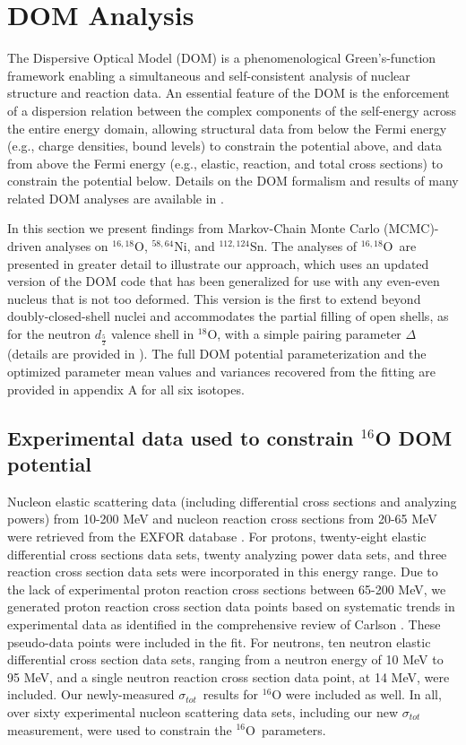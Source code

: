 \documentclass[twocolumn,secnumarabic,amssymb, nobibnotes, aps, prl,
superscriptaddress, nobalancelastpage]{revtex4}
\newcommand{\tot}{\ensuremath{\sigma_{tot}}}
\newcommand{\oSix}{\ensuremath{^{16}}O}
\newcommand{\oEight}{\ensuremath{^{18}}O}
\newcommand{\oSixEight}{\ensuremath{^{16,18}}O}
\newcommand{\niEightFour}{\ensuremath{^{58,64}}N\lowercase{i}}
\newcommand{\snTwelveFour}{\ensuremath{^{112,124}}S\lowercase{n}}
\begin{document}
\section{DOM Analysis}

The Dispersive Optical Model (DOM) is a phenomenological Green's-function
framework enabling a simultaneous and self-consistent analysis of nuclear
structure and reaction data.
An essential feature of the DOM is the enforcement of a dispersion
relation between the complex components of the self-energy across the entire
energy domain, allowing structural data from below the Fermi energy
(e.g., charge densities, bound levels) to constrain the potential above,
and data from above the Fermi energy (e.g., elastic, reaction, and total
cross sections) to constrain the potential
below. Details on the DOM formalism and results of many related DOM analyses are
available in \cite{Mahaux1991, Dickhoff2018, PruittPhDThesis, AtkinsonPhDThesis, MahzoonPhDThesis}.

In this section we present findings from Markov-Chain Monte Carlo
(MCMC)-driven analyses on \oSixEight, \niEightFour, and \snTwelveFour.
The analyses of \oSixEight\ are presented in
greater detail to illustrate our approach, which uses an updated version
of the DOM code that has been generalized for use with any even-even nucleus
that is not too deformed.  This version is the first to extend beyond doubly-closed-shell
nuclei and accommodates the partial filling
of open shells, as for the neutron $d_{\frac{5}{2}}$ valence shell in \oEight, with a simple
pairing parameter $\Delta$ (details are provided in \cite{PruittPhDThesis}).
The full DOM potential parameterization and the optimized parameter mean values
and variances recovered from the fitting are provided in appendix A for all six
isotopes.

\subsection{Experimental data used to constrain $^{16}$O DOM potential}

Nucleon elastic scattering data (including differential cross sections and analyzing
powers) from 10-200 MeV and nucleon reaction cross sections from 20-65 MeV
were retrieved from the EXFOR database \cite{EXFORDatabase}.
For protons, twenty-eight elastic differential cross
sections data sets, twenty analyzing power data sets,
and three reaction cross section data sets were
incorporated in this energy range. Due to the lack of experimental proton
reaction cross sections between 65-200 MeV, we generated proton reaction cross
section data points based on systematic trends in experimental data 
as identified in the comprehensive review of Carlson \cite{Carlson1996}.
These pseudo-data points were included in the fit. For
neutrons, ten neutron elastic differential cross section
data sets, ranging from a neutron energy of 10 MeV to 95 MeV, and a single
neutron reaction cross section data point, at 14 MeV, were included. 
Our newly-measured \tot\ results for $^{16}$O were included as well. In all,
over sixty experimental nucleon scattering data sets, including our new \tot
measurement, were used to constrain the \oSix\ parameters.
\end{document}
